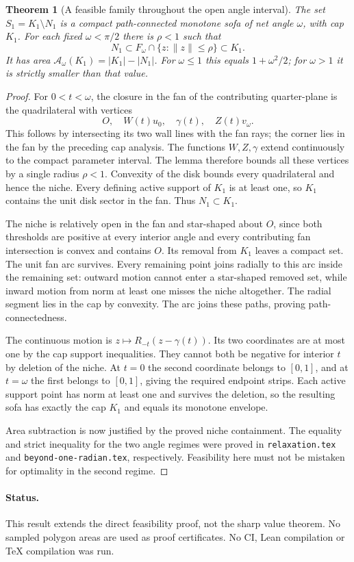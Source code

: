 \documentclass[11pt]{article}
\newtheorem{theorem}{Theorem}
\begin{document}
\begin{theorem}[A feasible family throughout the open angle interval]
The set $S_1=K_1\setminus N_1$ is a compact path-connected monotone sofa of net angle $\omega$, with cap $K_1$. For each fixed $\omega<\pi/2$ there is $\rho<1$ such that
\[
 N_1\subset F_\omega\cap\{z:\|z\|\le\rho\}\subset K_1.
\]
It has area $\mathcal A_\omega(K_1)=|K_1|-|N_1|$. For $\omega\le1$ this equals $1+\omega^2/2$; for $\omega>1$ it is strictly smaller than that value.
\end{theorem}
\begin{proof}
For $0<t<\omega$, the closure in the fan of the contributing quarter-plane is the quadrilateral with vertices
\[
 O,\quad W(t)u_0,\quad\gamma(t),\quad Z(t)v_\omega.
\]
This follows by intersecting its two wall lines with the fan rays; the corner lies in the fan by the preceding cap analysis. The functions $W,Z,\gamma$ extend continuously to the compact parameter interval. The lemma therefore bounds all these vertices by a single radius $\rho<1$. Convexity of the disk bounds every quadrilateral and hence the niche. Every defining active support of $K_1$ is at least one, so $K_1$ contains the unit disk sector in the fan. Thus $N_1\subset K_1$.

The niche is relatively open in the fan and star-shaped about $O$, since both thresholds are positive at every interior angle and every contributing fan intersection is convex and contains $O$. Its removal from $K_1$ leaves a compact set. The unit fan arc survives. Every remaining point joins radially to this arc inside the remaining set: outward motion cannot enter a star-shaped removed set, while inward motion from norm at least one misses the niche altogether. The radial segment lies in the cap by convexity. The arc joins these paths, proving path-connectedness.

The continuous motion is $z\mapsto R_{-t}(z-\gamma(t))$. Its two coordinates are at most one by the cap support inequalities. They cannot both be negative for interior $t$ by deletion of the niche. At $t=0$ the second coordinate belongs to $[0,1]$, and at $t=\omega$ the first belongs to $[0,1]$, giving the required endpoint strips. Each active support point has norm at least one and survives the deletion, so the resulting sofa has exactly the cap $K_1$ and equals its monotone envelope.

Area subtraction is now justified by the proved niche containment. The equality and strict inequality for the two angle regimes were proved in \texttt{relaxation.tex} and \texttt{beyond-one-radian.tex}, respectively. Feasibility here must not be mistaken for optimality in the second regime.
\end{proof}

\paragraph{Status.}
This result extends the direct feasibility proof, not the sharp value theorem. No sampled polygon areas are used as proof certificates. No CI, Lean compilation or TeX compilation was run.
\end{document}
